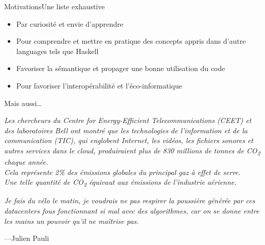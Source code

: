 \begin{frame}{Motivations}{Une liste exhaustive}
    \begin{itemize}[<+->]
        \item Par curiosité et envie d'apprendre
        \item Pour comprendre et mettre en pratique des concepts appris dans
        d'autre languages tels que Haskell
        \item Favoriser la sémantique et propager une bonne utilisation du code
        \item Pour favoriser l'interopérabilité et l'éco-informatique
    \end{itemize}
\end{frame}

\begin{frameC}{Mais aussi\ldots}

\end{frameC}

\begin{frame}
    \begin{flushleft}
        \textit{
            Les chercheurs du Centre for Energy-Efficient Telecommunications (CEET) et des laboratoires Bell ont montré que
            les technologies de l'information et de la communication (TIC), qui englobent Internet, les vidéos, les fichiers sonores
            et autres services dans le cloud, produiraient plus de 830 millions de tonnes de CO\textsubscript{2} chaque année.\\
            Cela représente 2\% des émissions globales du principal gaz à effet de serre.\\
            Une telle quantité de CO\textsubscript{2} équivaut aux émissions de l'industrie aérienne.
        }
    \end{flushleft}

\end{frame}

\begin{frame}
    \begin{flushleft}
        \textit{
            Je fais du vélo le matin, je voudrais ne pas respirer la poussière générée
            par ces datacenters fous fonctionnant si mal avec des algorithmes,
            car on se donne entre les mains un pouvoir qu'il ne maîtrise pas.
        }
        \begin{flushright}
            \tiny{---Julien Pauli}
        \end{flushright}
    \end{flushleft}

\end{frame}

